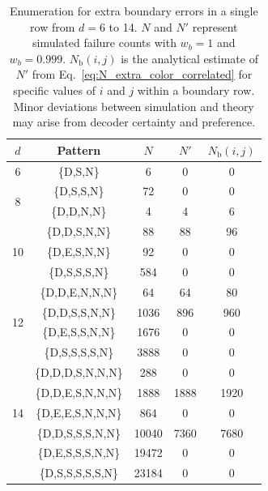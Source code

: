 \documentclass[%
 reprint,
 amsmath,amssymb,
 aps,
]{revtex4-2}
\begin{document}
\begin{table}[hb]
    \centering
    \begin{tabular}{|c|c|c|c|c|}
    \hline
    $d$ & Pattern & $N$& $N'$ & $N_\textrm{b}(i,j)$ \\
    \hline
    6 & \{D,S,N\} & 6 & 0 & 0\\
    \hline
    \multirow{2}{*}{8} & \{D,S,S,N\} & 72 & 0 & 0\\
     & \{D,D,N,N\} & 4 & 4 & 6  \\
    \hline
    \multirow{3}{*}{10} & \{D,D,S,N,N\} & 88 & 88 & 96 \\
     & \{D,E,S,N,N\} & 92 & 0 & 0\\
     & \{D,S,S,S,N\} & 584 & 0 & 0\\
    \hline
    \multirow{4}{*}{12}  & \{D,D,E,N,N,N\} & 64 & 64 & 80 \\
                         & \{D,D,S,S,N,N\} &1036& 896 & 960  \\          
                         & \{D,E,S,S,N,N\} &1676& 0 &  0 \\  
                         & \{D,S,S,S,S,N\} &3888& 0 &  0 \\          
    \hline
    \multirow{5}{*}{14}  & \{D,D,D,S,N,N,N\} & 288 & 0 & 0\\
                         & \{D,D,E,S,N,N,N\} &1888& 1888 & 1920 \\
                         & \{D,E,E,S,N,N,N\} &864 & 0 &0 \\
                         & \{D,D,S,S,S,N,N\} &10040& 7360 & 7680  \\
                         & \{D,E,S,S,S,N,N\} &19472&0&0 \\
                         & \{D,S,S,S,S,S,N\} &23184&0&0 \\
    \hline
    \end{tabular}
    \caption{Enumeration for extra boundary errors in a single row from $d=6$ to 14. $N$ and $N'$ represent simulated failure counts with $w_b=1$ and $w_b=0.999$. $N_\textrm{b}(i,j)$ is the analytical estimate of $N'$ from Eq.~\ref{eq:N_extra_color_correlated} for specific values of $i$ and $j$ within a boundary row. Minor deviations between simulation and theory may arise from decoder certainty and preference.} 
    \label{tab:enumerating_error}
\end{table}
\end{document}
